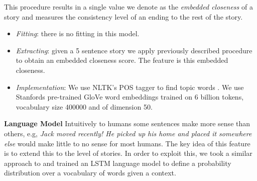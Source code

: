 \documentclass{article}
\begin{document}
This procedure results in a single value we denote as the \textit{embedded
    closeness} of a story and measures the consistency level of an ending to the
rest of the story.
%
\begin{itemize}
	\item \textit{Fitting}: there is no fitting in this model.
	\item \textit{Extracting}: given a 5 sentence story we apply previously described procedure to obtain an embedded closeness score. The feature is this embedded closeness.
	\item \textit{Implementation}: We use NLTK's POS tagger to find topic words \cite{NLTK_VADER}. We use Stanfords pre-trained GloVe word embeddings \cite{GLOVE} trained on 6 billion tokens, vocabulary size 400000  and of dimension 50.
\end{itemize}
%
\textbf{Language Model} Intuitively to humans some sentences make more sense
than others, e.g, \textit{Jack moved recently! He picked up his home and placed
    it somewhere else} would make little to no sense for most humans. The key
idea of this feature is to extend this to the level of stories. In order to
exploit this, we took a similar approach to \cite{UWNLP} and trained an LSTM
language model to define a probability distribution over a vocabulary of words
given a context. 
\end{document}
